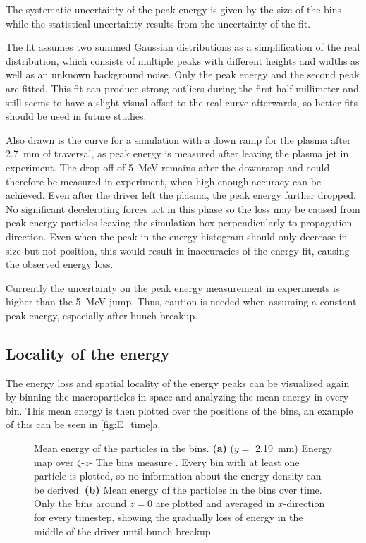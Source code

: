 \documentclass[bachelor_thesis]{subfiles}
\begin{document}
The systematic uncertainty of the peak energy is given by the size of the bins while the statistical uncertainty results from the uncertainty of the fit. 

The fit assumes two summed Gaussian distributions as a simplification of the real distribution, which consists of multiple peaks with different heights and widths as well as an unknown background noise. Only the peak energy and the second peak are fitted.
This fit can produce strong outliers during the first half millimeter and still seems to have a slight visual offset to the real curve afterwards, so better fits should be used in future studies.

Also drawn is the curve for a simulation with a down ramp for the plasma after \qty{2.7}{\mm} of traversal, as peak energy is measured after leaving the plasma jet in experiment. The drop-off of \qty{5}{\MeV} remains after 
the downramp and could therefore be measured in experiment, when high enough accuracy can be achieved. Even after the driver left the plasma, the peak energy further dropped. No significant decelerating forces act in this phase so the loss may be caused
from peak energy particles leaving the simulation box perpendicularly to propagation direction. Even when the peak in the energy histogram should only decrease in size but not position, this would result in inaccuracies of the energy fit,
causing the observed energy loss.

Currently the uncertainty on the peak energy measurement in experiments is higher than the \qty{5}{\MeV} jump. Thus, caution is needed when assuming a constant peak energy, especially after bunch breakup.

\subsection{Locality of the energy}\label{chap:loc_E}
The energy loss and spatial locality of the energy peaks can be visualized again by binning the macroparticles in space and analyzing the mean energy in every bin. This mean energy is then plotted over the positions of the bins,
an example of this can be seen in \autoref{fig:E_time}a. 
\begin{figure}
	\centering
	
	\caption{Mean energy of the particles in the bins.
	\textbf{(a)} ($y=$ \qty{2.19}{mm}) Energy map over $\zeta$-$z$- The bins measure . Every bin with at least one particle is plotted, so no information about the energy density can be derived.
	\textbf{(b)} Mean energy of the particles in the bins over time. Only the bins around $z=0$ are plotted and averaged in $x$-direction for every timestep, showing the gradually loss of energy in the middle of the driver until bunch breakup.}
	\label{fig:E_time}
\end{figure}
\end{document}
